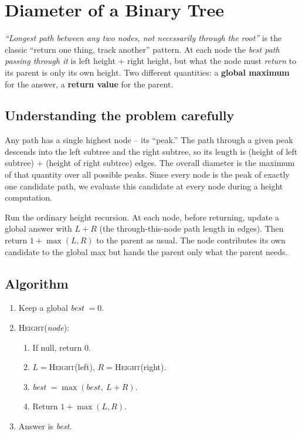 \section{Diameter of a Binary Tree}
\label{sec:trees-diameter}


\begin{patternbox}
\emph{``Longest path between any two nodes, not necessarily through the
root''} is the classic ``return one thing, track another'' pattern. At
each node the \emph{best path passing through it} is left height $+$ right
height, but what the node must \emph{return} to its parent is only its own
height. Two different quantities: a \textbf{global maximum} for the answer,
a \textbf{return value} for the parent.
\end{patternbox}

\subsection*{Understanding the problem carefully}

Any path has a single highest node -- its ``peak.'' The path through a
given peak descends into the left subtree and the right subtree, so its
length is (height of left subtree) $+$ (height of right subtree) edges.
The overall diameter is the maximum of that quantity over all possible
peaks. Since every node is the peak of exactly one candidate path, we
evaluate this candidate at every node during a height computation.

\begin{ideabox}
Run the ordinary height recursion. At each node, before returning, update
a global answer with $L+R$ (the through-this-node path length in edges).
Then return $1+\max(L,R)$ to the parent as usual. The node contributes its
own candidate to the global max but hands the parent only what the parent
needs.
\end{ideabox}

\subsection*{Algorithm}

\begin{enumerate}
  \item Keep a global \textit{best} $=0$.
  \item \textsc{Height}(\textit{node}):
  \begin{enumerate}
    \item If null, return $0$.
    \item $L=$\textsc{Height}(left), $R=$\textsc{Height}(right).
    \item \textit{best} $=\max(\textit{best},\ L+R)$.
    \item Return $1+\max(L,R)$.
  \end{enumerate}
  \item Answer is \textit{best}.
\end{enumerate}


